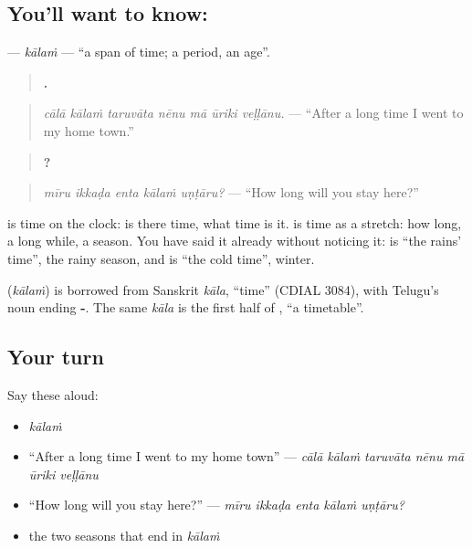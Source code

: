 \subsection*{You'll want to know: }
\textbf{} — \emph{kālaṁ} — \textquotedblleft{}a span of time; a period, an age\textquotedblright{}.

\begin{quote}
\textbf{      .}
\end{quote}

\begin{quote}
\emph{cālā kālaṁ taruvāta nēnu mā ūriki veḷḷānu.} — \textquotedblleft{}After a long time I went to my home town.\textquotedblright{}
\end{quote}

\begin{quote}
\textbf{    ?}
\end{quote}

\begin{quote}
\emph{mīru ikkaḍa enta kālaṁ uṇṭāru?} — \textquotedblleft{}How long will you stay here?\textquotedblright{}
\end{quote}

\textbf{} is time on the clock: is there time, what time is it. \textbf{} is time as a stretch: how long, a long while, a season. You have said it already without noticing it: \textbf{} is \textquotedblleft{}the rains' time\textquotedblright{}, the rainy season, and \textbf{} is \textquotedblleft{}the cold time\textquotedblright{}, winter.

\begin{cousinweb}
\textbf{} (\emph{kālaṁ}) is borrowed from Sanskrit \emph{kāla}, \textquotedblleft{}time\textquotedblright{} (CDIAL 3084), with Telugu's noun ending \textbf{-}. The same \emph{kāla} is the first half of \textbf{}, \textquotedblleft{}a timetable\textquotedblright{}.
\end{cousinweb}

\subsection*{Your turn}
Say these aloud:

\begin{itemize}
\raggedright
  \item \emph{kālaṁ}
  \item \textquotedblleft{}After a long time I went to my home town\textquotedblright{} — \emph{cālā kālaṁ taruvāta nēnu mā ūriki veḷḷānu}
  \item \textquotedblleft{}How long will you stay here?\textquotedblright{} — \emph{mīru ikkaḍa enta kālaṁ uṇṭāru?}
  \item the two seasons that end in \emph{kālaṁ}
\end{itemize}

